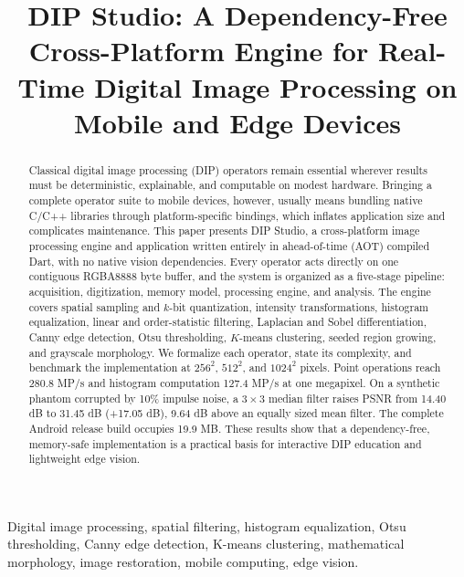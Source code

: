 \documentclass[journal]{IEEEtran}
\begin{document}
\title{DIP Studio: A Dependency-Free Cross-Platform Engine for Real-Time Digital Image Processing on Mobile and Edge Devices}
\author{}
\maketitle

\begin{abstract}
Classical digital image processing (DIP) operators remain essential wherever results must be deterministic, explainable, and computable on modest hardware. Bringing a complete operator suite to mobile devices, however, usually means bundling native C/C++ libraries through platform-specific bindings, which inflates application size and complicates maintenance. This paper presents DIP Studio, a cross-platform image processing engine and application written entirely in ahead-of-time (AOT) compiled Dart, with no native vision dependencies. Every operator acts directly on one contiguous RGBA8888 byte buffer, and the system is organized as a five-stage pipeline: acquisition, digitization, memory model, processing engine, and analysis. The engine covers spatial sampling and $k$-bit quantization, intensity transformations, histogram equalization, linear and order-statistic filtering, Laplacian and Sobel differentiation, Canny edge detection, Otsu thresholding, $K$-means clustering, seeded region growing, and grayscale morphology. We formalize each operator, state its complexity, and benchmark the implementation at $256^2$, $512^2$, and $1024^2$ pixels. Point operations reach 280.8 MP/s and histogram computation 127.4 MP/s at one megapixel. On a synthetic phantom corrupted by 10\% impulse noise, a $3\times3$ median filter raises PSNR from 14.40 dB to 31.45 dB (+17.05 dB), 9.64 dB above an equally sized mean filter. The complete Android release build occupies 19.9 MB. These results show that a dependency-free, memory-safe implementation is a practical basis for interactive DIP education and lightweight edge vision.
\end{abstract}

\begin{IEEEkeywords}
Digital image processing, spatial filtering, histogram equalization, Otsu thresholding, Canny edge detection, K-means clustering, mathematical morphology, image restoration, mobile computing, edge vision.
\end{IEEEkeywords}
\end{document}
